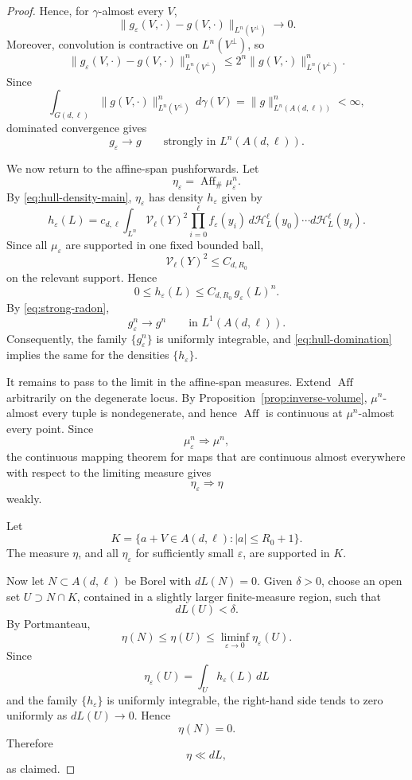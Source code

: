 \documentclass[11pt]{article}
\theoremstyle{remark}
\newcommand{\cH}{\mathcal H}
\newcommand{\eps}{\varepsilon}
\numberwithin{equation}{section}
\newcommand{\1}{\mathbf 1}
\begin{document}
\begin{proof}
Hence, for \(\gamma\)-almost every \(V\),
\[
\|g_\eps(V,\cdot)-g(V,\cdot)\|_{L^n(V^\perp)}
\longrightarrow 0.
\]
Moreover, convolution is contractive on \(L^n(V^\perp)\), so
\[
\|g_\eps(V,\cdot)-g(V,\cdot)\|_{L^n(V^\perp)}^n
\leq
2^n\|g(V,\cdot)\|_{L^n(V^\perp)}^n.
\]
Since
\[
\int_{G(d,\ell)}
\|g(V,\cdot)\|_{L^n(V^\perp)}^n\,d\gamma(V)
=
\|g\|_{L^n(A(d,\ell))}^n
<\infty,
\]
dominated convergence gives
\begin{equation}
g_\eps\longrightarrow g
\qquad\text{strongly in }L^n(A(d,\ell)).
\label{eq:strong-radon}
\end{equation}

We now return to the affine-span pushforwards.  Let
\[
\eta_\eps=\operatorname{Aff}_\#\mu_\eps^n.
\]
By \eqref{eq:hull-density-main}, \(\eta_\eps\) has density \(h_\eps\)
given by
\[
h_\eps(L)
=
c_{d,\ell}
\int_{L^n}
\mathcal V_\ell(Y)^2
\prod_{i=0}^\ell f_\eps(y_i)\,
d\cH_L^\ell(y_0)\cdots d\cH_L^\ell(y_\ell).
\]
Since all \(\mu_\eps\) are supported in one fixed bounded ball,
\[
\mathcal V_\ell(Y)^2
\leq C_{d,R_0}
\]
on the relevant support.  Hence
\begin{equation}
0\leq h_\eps(L)
\leq
C_{d,R_0}\,g_\eps(L)^n.
\label{eq:hull-domination}
\end{equation}
By \eqref{eq:strong-radon},
\[
g_\eps^n\longrightarrow g^n
\qquad\text{in }L^1(A(d,\ell)).
\]
Consequently, the family \(\{g_\eps^n\}\) is uniformly integrable, and
\eqref{eq:hull-domination} implies the same for the densities
\(\{h_\eps\}\).

It remains to pass to the limit in the affine-span measures.  Extend
\(\operatorname{Aff}\) arbitrarily on the degenerate locus.  By
Proposition~\ref{prop:inverse-volume}, \(\mu^n\)-almost every tuple is
nondegenerate, and hence \(\operatorname{Aff}\) is continuous at
\(\mu^n\)-almost every point. Since
\[
\mu_\eps^n\Longrightarrow \mu^n,
\]
the continuous mapping theorem for maps that are continuous almost
everywhere with respect to the limiting measure gives
\[
\eta_\eps\Longrightarrow\eta
\]
weakly.

Let
\[
K=
\{a+V\in A(d,\ell): |a|\leq R_0+1\}.
\]
The measure \(\eta\), and all \(\eta_\eps\) for sufficiently small
\(\eps\), are supported in \(K\).

Now let \(N\subset A(d,\ell)\) be Borel with \(dL(N)=0\).  Given
\(\delta>0\), choose an open set \(U\supset N\cap K\), contained in a
slightly larger finite-measure region, such that
\[
dL(U)<\delta.
\]
By Portmanteau,
\[
\eta(N)
\leq
\eta(U)
\leq
\liminf_{\eps\to0}\eta_\eps(U).
\]
Since
\[
\eta_\eps(U)=\int_U h_\eps(L)\,dL
\]
and the family \(\{h_\eps\}\) is uniformly integrable, the right-hand
side tends to zero uniformly as \(dL(U)\to0\).  Hence
\[
\eta(N)=0.
\]
Therefore
\[
\eta\ll dL,
\]
as claimed.
\end{proof}
\end{document}
